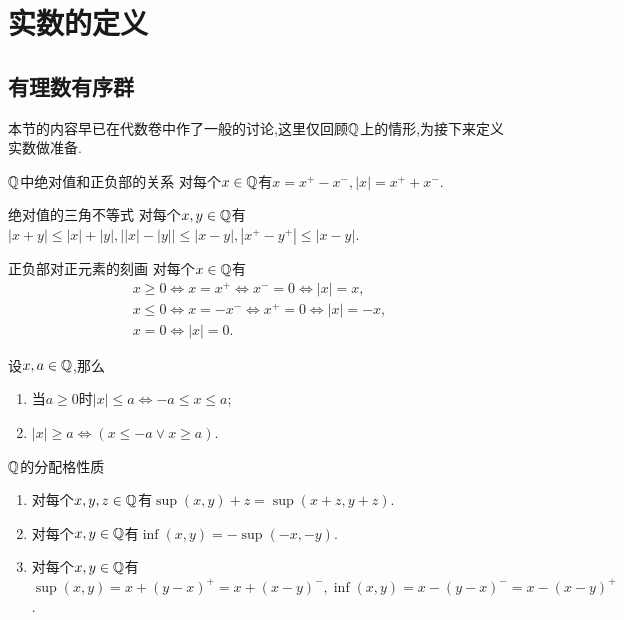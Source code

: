 \chapter{实数的定义}

\section{有理数有序群}

本节的内容早已在代数卷中作了一般的讨论,这里仅回顾$\mathbb{Q}$上的情形,为接下来定义实数做准备.

\begin{proposition}{$\mathbb{Q}$中绝对值和正负部的关系}{}
	对每个$x\in\mathbb{Q}$有$x=x^{+}-x^{-},\left|x\right|=x^{+}+x^{-}$.
\end{proposition}

\begin{proposition}{绝对值的三角不等式}{}
	对每个$x,y\in\mathbb{Q}$有$\left|x+y\right|\leq\left|x\right|+\left|y\right|,\left|\left|x\right|-\left|y\right|\right|\leq\left|x-y\right|,\left|x^{+}-y^{+}\right|\leq\left|x-y\right|$.
\end{proposition}

\begin{proposition}{正负部对正元素的刻画}{}
	对每个$x\in\mathbb{Q}$有
	\begin{gather*}
		x\geq 0\iff x=x^{+}\iff x^{-}=0\iff\left|x\right|=x,\\
		x\leq 0\iff x=-x^{-}\iff x^{+}=0\iff\left|x\right|=-x,\\
		x=0\iff\left|x\right|=0.
	\end{gather*}
\end{proposition}

\begin{proposition}{}{}
	设$x,a\in\mathbb{Q}$,那么
	\begin{enumerate}
		\item 当$a\geq 0$时$\left|x\right|\leq a\iff -a\leq x\leq a$;
		\item $\left|x\right|\geq a\iff\left(x\leq -a\vee x\geq a\right)$.
	\end{enumerate}
\end{proposition}

\begin{proposition}{$\mathbb{Q}$的分配格性质}{}
	\begin{enumerate}
		\item 对每个$x,y,z\in\mathbb{Q}$有$\sup\left(x,y\right)+z=\sup\left(x+z,y+z\right)$.
		\item 对每个$x,y\in\mathbb{Q}$有$\inf\left(x,y\right)=-\sup\left(-x,-y\right)$.
		\item 对每个$x,y\in\mathbb{Q}$有$\sup\left(x,y\right)=x+\left(y-x\right)^{+}=x+\left(x-y\right)^{-},\inf\left(x,y\right)=x-\left(y-x\right)^{-}=x-\left(x-y\right)^{+}$.
	\end{enumerate}
\end{proposition}

